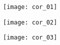 \ifprof
\begin{center}
\texttt{[image: cor\_01]}
\end{center}

\begin{center}
\texttt{[image: cor\_02]}
\end{center}

\begin{center}
\texttt{[image: cor\_03]}
\end{center}
\else
\fi